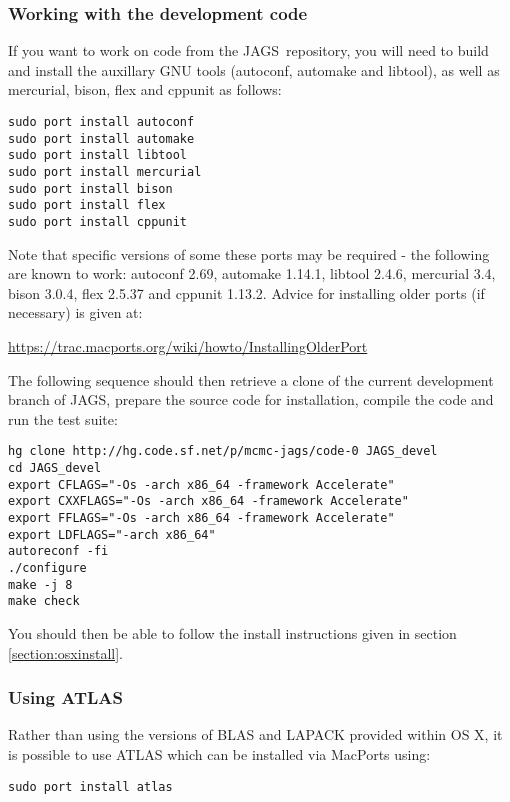 \documentclass[11pt, a4paper, titlepage]{article}
\newcommand{\JAGS}{\textsf{JAGS}}
\begin{document}
\subsubsection{Working with the development code}

If you want to work on code from the \JAGS\ repository, you will need to
build and install the auxillary GNU tools (autoconf, automake and
libtool), as well as mercurial, bison, flex and cppunit as follows:

\begin{verbatim}
sudo port install autoconf
sudo port install automake
sudo port install libtool
sudo port install mercurial
sudo port install bison
sudo port install flex
sudo port install cppunit
\end{verbatim}

Note that specific versions of some these ports may be required - the following 
are known to work:  autoconf 2.69, automake 1.14.1, libtool 2.4.6, 
mercurial 3.4, bison 3.0.4, flex 2.5.37 and cppunit 1.13.2.  Advice for
installing older ports (if necessary) is given at:

 \url{https://trac.macports.org/wiki/howto/InstallingOlderPort}

The following sequence should then retrieve a clone of the current
development branch of \JAGS, prepare the source code for
installation, compile the code and run the test suite:

\begin{verbatim} 
hg clone http://hg.code.sf.net/p/mcmc-jags/code-0 JAGS_devel
cd JAGS_devel
export CFLAGS="-Os -arch x86_64 -framework Accelerate"
export CXXFLAGS="-Os -arch x86_64 -framework Accelerate"
export FFLAGS="-Os -arch x86_64 -framework Accelerate"
export LDFLAGS="-arch x86_64"
autoreconf -fi
./configure
make -j 8
make check
\end{verbatim}

You should then be able to follow the install instructions given in section \ref{section:osxinstall}.

\subsubsection{Using ATLAS}

Rather than using the versions of BLAS and LAPACK provided within OS X, it
is possible to use ATLAS which can be installed via MacPorts using:

\begin{verbatim}
sudo port install atlas
\end{verbatim}
\end{document}
